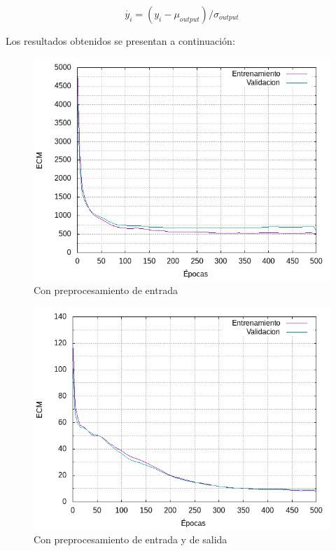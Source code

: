 \begin{equation}
  \dot{y_{i}} = (y_{i} - \mu_{output}) / \sigma_{output}
\end{equation}

Los resultados obtenidos se presentan a continuación:

\begin{figure}[H]
  \includegraphics[width=125mm]{imagenes/ej2/ex_1-1_red-9-17-2_errors.png}
  \caption{Con preprocesamiento de entrada}
\end{figure}

\begin{figure}[H]
  \includegraphics[width=125mm]{imagenes/ej2/ex_1-2_red-9-17-2_errors.png}
  \caption{Con preprocesamiento de entrada y de salida}
\end{figure}

